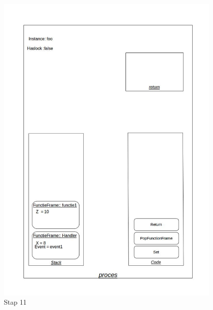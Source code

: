 \documentclass[]{article}
\begin{document}
\begin{figure}[H]
\centering
\includegraphics[scale=0.4]{AnalyseADTAlgorithm/processtappen/stap9.jpg}
\caption{Stap 11}
\end{figure}
\end{document}
